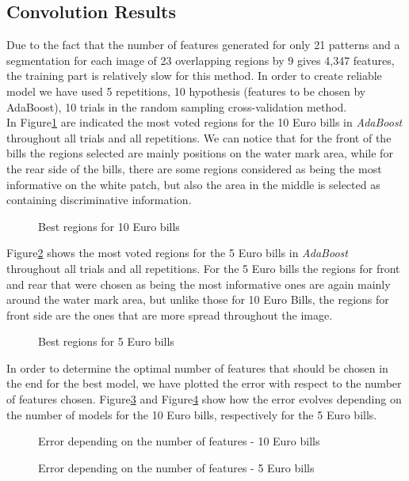 \documentclass[11pt,twocolumn]{article}
\begin{document}
	\subsection{Convolution Results}\label{sec:haar_results}
	\hspace*{10px}Due to the fact that the number of features generated for only 21 patterns and a segmentation for each image of 23 overlapping regions by 9 gives 4,347 features, the training part is relatively slow for this method. In order to create reliable model we have used 5 repetitions, 10 hypothesis (features to be chosen by AdaBoost), 10 trials in the random sampling cross-validation method.\\
	\hspace*{10px}In Figure\ref{haar_regions10} are indicated the most voted regions for the 10 Euro bills in \emph{AdaBoost} throughout all trials and all repetitions. We can notice that for the front of the bills the regions selected are mainly positions on the water mark area, while for the rear side of the bills, there are some regions considered as being the most informative on the white patch, but also the area in the middle is selected as containing discriminative information.\\  
\begin{figure}[!hbtp]
\centering
{}
\caption{Best regions for 10 Euro bills}
\label{haar_regions10}
\end{figure}
	\hspace*{10px}Figure\ref{haar_regions5} shows the most voted regions for the 5 Euro bills in \emph{AdaBoost} throughout all trials and all repetitions. For the 5 Euro bills the regions for front and rear that were chosen as being the most informative ones are again mainly around the water mark area, but unlike those for 10 Euro Bills, the regions for front side are the ones that are more spread throughout the image.\\  
\begin{figure}[!hbtp]
\centering
{}
\caption{Best regions for 5 Euro bills}
\label{haar_regions5}
\end{figure} 
	\hspace*{10px}In order to determine the optimal number of features that should be chosen in the end for the best model, we have plotted the error with respect to the number of features chosen. Figure\ref{haar_plot10} and Figure\ref{haar_plot5} show how the error evolves depending on the number of models for the 10 Euro bills, respectively for the 5 Euro bills.
\begin{figure}[!hbtp]
\centering
{}
\caption{Error depending on the number of features - 10 Euro bills}
\label{haar_plot10}
\end{figure} 
\begin{figure}[!hbtp]
\centering
{}
\caption{Error depending on the number of features - 5 Euro bills}
\label{haar_plot5}
\end{figure} 
\end{document}
